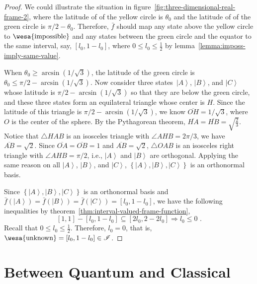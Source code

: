 \documentclass[12pt]{iopart}
\theoremstyle{plain}
\theoremstyle{definition}
\newcommand{\imposs}{{\mbox{\wesa{impossible}}}}
\newcommand{\unknown}{{\mbox{\wesa{unknown}}}}
\newcommand{\ket}[1]{{\left\vert{#1}\right\rangle}}
\begin{document}
\begin{proof}
We could illustrate the situation in figure~\ref{fig:three-dimensional-real-frame-2},
where the latitude of of the yellow circle is $\theta_{0}$ and the
latitude of of the green circle is $\pi / 2-\theta_{0}$. Therefore,
$\bar{f}$ should map any state above the yellow circle to $\imposs$
and any states between the green circle and the equator to the same
interval, say, $\left[l_{0},1-l_{0}\right]$, where $0\le l_{0}\le\frac{1}{2}$
by lemma~\ref{lemma:imposs-imply-same-value}.

When $\theta_{0}\ge\arcsin\left(1 / \sqrt{3}\right)$, the latitude
of the green circle is $\theta_{0}\le\pi / 2-\arcsin\left(1 / \sqrt{3}\right)$.
Now consider three states~$\ket{A}$, $\ket{B}$, and $\ket{C}$
whose latitude is $\pi / 2-\arcsin\left(1 / \sqrt{3}\right)$
so that they are below the green circle, and these three states form
an equilateral triangle whose center is $H$. Since the latitude of
this triangle is $\pi / 2-\arcsin\left(1 / \sqrt{3}\right)$,
we know $\overline{OH}=1 / \sqrt{3}$, where $O$ is the center
of the sphere. By the Pythagorean theorem, $\overline{HA}=\overline{HB}=\sqrt{\frac{2}{3}}$.
Notice that $\triangle HAB$ is an isosceles triangle with $\angle AHB=2\pi / 3$,
we have $\overline{AB}=\sqrt{2}$. Since $\overline{OA}=\overline{OB}=1$
and $\overline{AB}=\sqrt{2}$, $\triangle OAB$ is an isosceles right
triangle with $\angle AHB=\pi / 2$, i.e., $\ket{A}$ and $\ket{B}$
are orthogonal. Applying the same reason on all $\ket{A}$, $\ket{B}$,
and $\ket{C}$, $\left\{ \ket{A},\ket{B},\ket{C}\right\} $ is an
orthonormal basis.

Since $\left\{ \ket{A},\ket{B},\ket{C}\right\} $ is an orthonormal
basis and $\bar{f}\left(\ket{A}\right)=\bar{f}\left(\ket{B}\right)=\bar{f}\left(\ket{C}\right)=\left[l_{0},1-l_{0}\right]$,
we have the following inequalities by theorem~\ref{thm:interval-valued-frame-function},
\begin{equation}
\left[1,1\right]-\left[l_{0},1-l_{0}\right]\subseteq\left[2l_{0},2-2l_{0}\right]\Rightarrow l_{0}\le0\textrm{ .}
\end{equation}
Recall that $0\le l_{0}\le\frac{1}{2}$. Therefore, $l_{0}=0$, that
is, $\unknown=\left[l_{0},1-l_{0}\right]\in\mathscr{I}$. \end{proof}

\section{Between Quantum and Classical}
\end{document}
